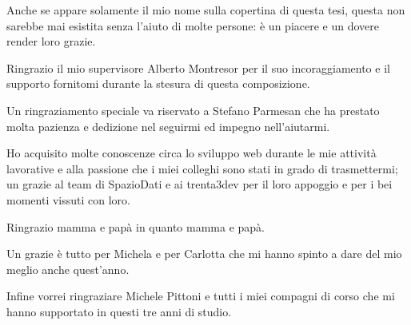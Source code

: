 
Anche se appare solamente il mio nome sulla copertina di questa tesi, questa non sarebbe mai esistita senza l'aiuto di molte persone: è un piacere e un dovere render loro grazie.

Ringrazio il mio supervisore Alberto Montresor per il suo incoraggiamento e il supporto fornitomi durante la stesura di questa composizione.

Un ringraziamento speciale va riservato a Stefano Parmesan che ha prestato molta pazienza e dedizione nel seguirmi ed impegno nell'aiutarmi.

Ho acquisito molte conoscenze circa lo sviluppo web durante le mie attività lavorative e alla passione che i miei colleghi sono stati in grado di trasmettermi; un grazie al team di SpazioDati e ai trenta3dev per il loro appoggio e per i bei momenti vissuti con loro.

Ringrazio mamma e papà in quanto mamma e papà.

Un grazie è tutto per Michela e per Carlotta che mi hanno spinto a dare del mio meglio anche quest'anno.

Infine vorrei ringraziare Michele Pittoni e tutti i miei compagni di corso che mi hanno supportato in questi tre anni di studio.